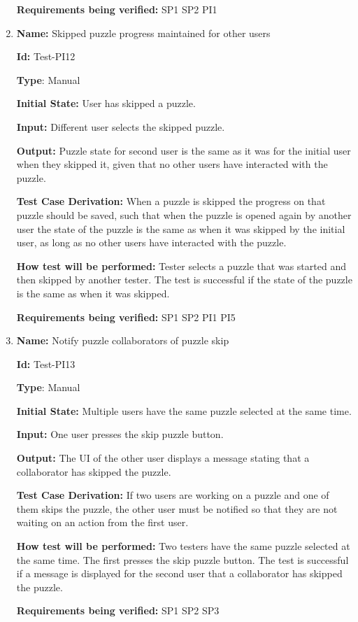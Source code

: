 \documentclass[12pt, titlepage]{article}
\begin{document}
\begin{enumerate}
\textbf{Requirements being verified: } SP1 SP2 PI1

\item{\textbf{Name:} Skipped puzzle progress maintained for other users}

\textbf{Id:} Test-PI12

\textbf{Type}: Manual

\textbf{Initial State:} User has skipped a puzzle.

\textbf{Input:} Different user selects the skipped puzzle.

\textbf{Output:} Puzzle state for second user is the same as it was for the initial user when they skipped it, given that no other users have interacted with the puzzle.

\textbf{Test Case Derivation:}
When a puzzle is skipped the progress on that puzzle should be saved, such that when the puzzle is opened again by another user the state of the puzzle is the same as when it was skipped by the initial user, as long as no other users have interacted with the puzzle.

\textbf{How test will be performed:}
Tester selects a puzzle that was started and then skipped by another tester. The test is successful if the state of the puzzle is the same as when it was skipped.

\textbf{Requirements being verified: } SP1 SP2 PI1 PI5

\item{\textbf{Name:} Notify puzzle collaborators of puzzle skip}

\textbf{Id:} Test-PI13

\textbf{Type}: Manual

\textbf{Initial State:} Multiple users have the same puzzle selected at the same time.

\textbf{Input:} One user presses the skip puzzle button.

\textbf{Output:} The UI of the other user displays a message stating that a collaborator has skipped the puzzle.

\textbf{Test Case Derivation:}
If two users are working on a puzzle and one of them skips the puzzle, the other user must be notified so that they are not waiting on an action from the first user.

\textbf{How test will be performed:}
Two testers have the same puzzle selected at the same time. The first presses the skip puzzle button. The test is successful if a message is displayed for the second user that a collaborator has skipped the puzzle.

\textbf{Requirements being verified: } SP1 SP2 SP3

\end{enumerate}
\end{document}
